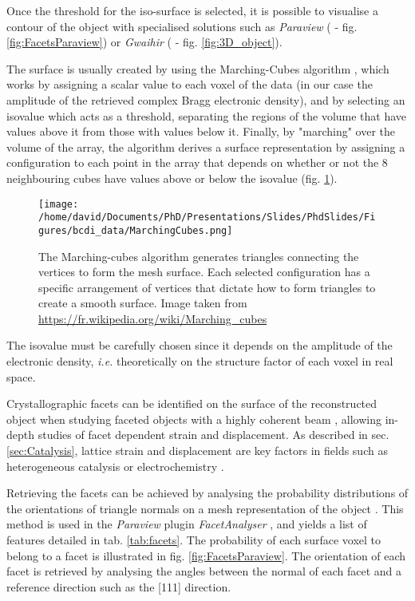Once the threshold for the iso-surface is selected, it is possible to visualise a contour of the object with specialised solutions such as \textit{Paraview} (\cite{Ahrens2001} - fig. \ref{fig:FacetsParaview}) or \textit{Gwaihir} (\cite{Simonne2022} - fig. \ref{fig:3D_object}).

The surface is usually created by using the Marching-Cubes algorithm \parencite{Lorensen1987}, which works by assigning a scalar value to each voxel of the data (in our case the amplitude of the retrieved complex Bragg electronic density), and by selecting an isovalue which acts as a threshold, separating the regions of the volume that have values above it from those with values below it.
Finally, by "marching" over the volume of the array, the algorithm derives a surface representation by assigning a configuration to each point in the array that depends on whether or not the 8 neighbouring cubes have values above or below the isovalue (fig. \ref{fig:MarchingCubes}).

\begin{figure}[!htb]
    \centering
    \texttt{[image: /home/david/Documents/PhD/Presentations/Slides/PhdSlides/Figures/bcdi\_data/MarchingCubes.png]}
    \caption{
    The Marching-cubes algorithm generates triangles connecting the vertices to form the mesh surface.
    Each selected configuration has a specific arrangement of vertices that dictate how to form triangles to create a smooth surface.
    Image taken from \url{https://fr.wikipedia.org/wiki/Marching_cubes}
    }
    \label{fig:MarchingCubes}
\end{figure}

The isovalue must be carefully chosen since it depends on the amplitude of the electronic density, \textit{i.e.} theoretically on the structure factor of each voxel in real space.

Crystallographic facets can be identified on the surface of the reconstructed object when studying faceted objects with a highly coherent beam \parencite{richard_crystallographic_2018}, allowing in-depth studies of facet dependent strain and displacement.
As described in sec. \ref{sec:Catalysis}, lattice strain and displacement are key factors in fields such as heterogeneous catalysis \parencite{ulvestad_situ_2016,kim_active_2018,fernandez_situ_2019,Passos2020,Carnis2021} or electrochemistry \parencite{vicente_bragg_2021, Atlan2023}.

Retrieving the facets can be achieved by analysing the probability distributions of the orientations of triangle normals on a mesh representation of the object \parencite{Grothausmann2012}.
This method is used in the \textit{Paraview} plugin \textit{FacetAnalyser} \parencite{GrothausmannBeare2015}, and yields a list of features detailed in tab. \ref{tab:facets}.
The probability of each surface voxel to belong to a facet is illustrated in fig. \ref{fig:FacetsParaview}.
The orientation of each facet is retrieved by analysing the angles between the normal of each facet and a reference direction such as the [111] direction.

